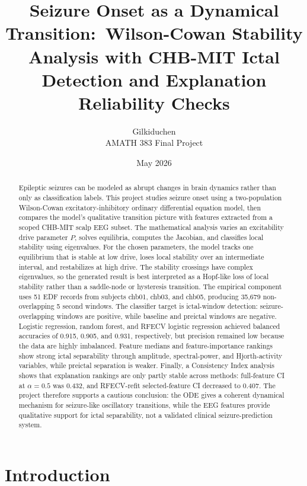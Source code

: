 \documentclass[11pt]{article}
\title{Seizure Onset as a Dynamical Transition:\ Wilson-Cowan Stability Analysis with CHB-MIT Ictal Detection and Explanation Reliability Checks}
\author{Gilkiduchen\\AMATH 383 Final Project}
\date{May 2026}
\begin{document}
\maketitle

\begin{abstract}
Epileptic seizures can be modeled as abrupt changes in brain dynamics rather than only as classification labels. This project studies seizure onset using a two-population Wilson-Cowan excitatory-inhibitory ordinary differential equation model, then compares the model's qualitative transition picture with features extracted from a scoped CHB-MIT scalp EEG subset. The mathematical analysis varies an excitability drive parameter $P$, solves equilibria, computes the Jacobian, and classifies local stability using eigenvalues. For the chosen parameters, the model tracks one equilibrium that is stable at low drive, loses local stability over an intermediate interval, and restabilizes at high drive. The stability crossings have complex eigenvalues, so the generated result is best interpreted as a Hopf-like loss of local stability rather than a saddle-node or hysteresis transition. The empirical component uses 51 EDF records from subjects chb01, chb03, and chb05, producing 35,679 non-overlapping 5 second windows. The classifier target is ictal-window detection: seizure-overlapping windows are positive, while baseline and preictal windows are negative. Logistic regression, random forest, and RFECV logistic regression achieved balanced accuracies of 0.915, 0.905, and 0.931, respectively, but precision remained low because the data are highly imbalanced. Feature medians and feature-importance rankings show strong ictal separability through amplitude, spectral-power, and Hjorth-activity variables, while preictal separation is weaker. Finally, a Consistency Index analysis shows that explanation rankings are only partly stable across methods: full-feature CI at $\alpha=0.5$ was 0.432, and RFECV-refit selected-feature CI decreased to 0.407. The project therefore supports a cautious conclusion: the ODE gives a coherent dynamical mechanism for seizure-like oscillatory transitions, while the EEG features provide qualitative support for ictal separability, not a validated clinical seizure-prediction system.
\end{abstract}

\section{Introduction}
\end{document}
